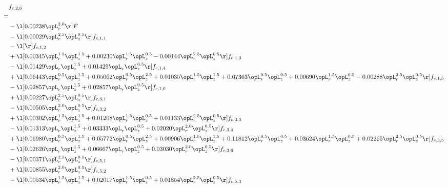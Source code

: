 \begin{alignat}{2} 
\label{eq:f_26_1} 
& f_{c,2,6} \nonumber \\ 
 = \\ 
& - \l[  0.00238 \opL_r^{3.0}  \r] F \nonumber \\ 
& - \l[  0.00029 \opL_r^{2.5} \opL_z^{0.5}  \r] f_{c,1,1} \nonumber \\ 
& - \l[  \r] f_{c,1,2} \nonumber \\ 
& + \l[  0.00345 \opL_r^{1.5} \opL_z^{1.5} +  0.00230 \opL_r^{1.5} \opL_z^{0.5}   -0.00144 \opL_r^{2.5} \opL_z^{0.5}  \r] f_{c,1,3} \nonumber \\ 
& - \l[  0.01429 \opL_r \opL_z^{1.5} +  0.01429 \opL_r \opL_z^{0.5}  \r] f_{c,1,4} \nonumber \\ 
& + \l[  0.06443 \opL_r^{0.5} \opL_z^{1.5} +  0.05062 \opL_r^{0.5} \opL_z^{2.5} +  0.01035 \opL_r^{1.5} \opL_z^{1.5} +  0.07363 \opL_r^{0.5} \opL_z^{0.5} +  0.00690 \opL_r^{1.5} \opL_z^{0.5}   -0.00288 \opL_r^{2.5} \opL_z^{0.5}  \r] f_{c,1,5} \nonumber \\ 
& - \l[  0.02857 \opL_r \opL_z^{1.5} +  0.02857 \opL_r \opL_z^{0.5}  \r] f_{c,1,6} \nonumber \\ 
& + \l[  0.00227 \opL_r^{2.5} \opL_z^{0.5}  \r] f_{c,3,1} \nonumber \\ 
& - \l[  0.00505 \opL_r^{2.0} \opL_z^{0.5}  \r] f_{c,3,2} \nonumber \\ 
& + \l[  0.00302 \opL_r^{1.5} \opL_z^{1.5} +  0.01208 \opL_r^{1.5} \opL_z^{0.5} +  0.01133 \opL_r^{2.5} \opL_z^{0.5}  \r] f_{c,3,3} \nonumber \\ 
& - \l[  0.01313 \opL_r \opL_z^{1.5} +  0.03333 \opL_r \opL_z^{0.5} +  0.02020 \opL_r^{2.0} \opL_z^{0.5}  \r] f_{c,3,4} \nonumber \\ 
& + \l[  0.06980 \opL_r^{0.5} \opL_z^{1.5} +  0.05772 \opL_r^{0.5} \opL_z^{2.5} +  0.00906 \opL_r^{1.5} \opL_z^{1.5} +  0.11812 \opL_r^{0.5} \opL_z^{0.5} +  0.03624 \opL_r^{1.5} \opL_z^{0.5} +  0.02265 \opL_r^{2.5} \opL_z^{0.5}  \r] f_{c,3,5} \nonumber \\ 
& - \l[  0.02626 \opL_r \opL_z^{1.5} +  0.06667 \opL_r \opL_z^{0.5} +  0.03030 \opL_r^{2.0} \opL_z^{0.5}  \r] f_{c,3,6} \nonumber \\ 
& - \l[  0.00371 \opL_r^{2.5} \opL_z^{0.5}  \r] f_{c,5,1} \nonumber \\ 
& + \l[  0.00855 \opL_r^{2.0} \opL_z^{0.5}  \r] f_{c,5,2} \nonumber \\ 
& - \l[  0.00534 \opL_r^{1.5} \opL_z^{1.5} +  0.02017 \opL_r^{1.5} \opL_z^{0.5} +  0.01854 \opL_r^{2.5} \opL_z^{0.5}  \r] f_{c,5,3} \nonumber \\ 

\end{alignat}

